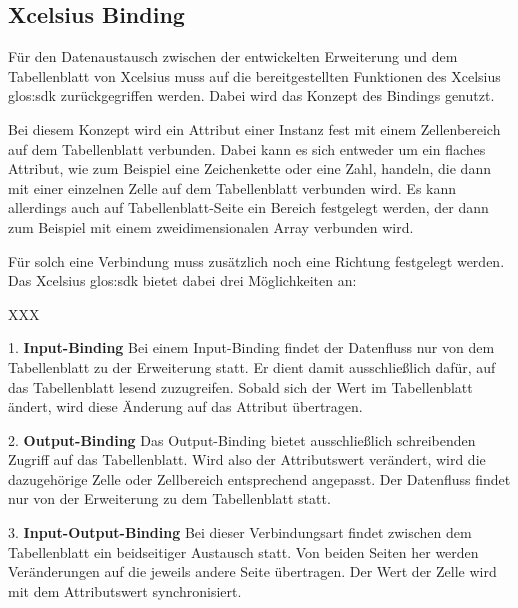 \begin{onehalfspacing}
\subsection{\gls{Xcelsius} Binding}
\label{sec:xcelsius_binding}
Für den Datenaustausch zwischen der entwickelten Erweiterung und dem Tabellenblatt von \gls{Xcelsius} muss auf die bereitgestellten Funktionen des \gls{Xcelsius} \gls{glos:sdk} zurückgegriffen werden. Dabei wird das Konzept des Bindings genutzt.

Bei diesem Konzept wird ein Attribut einer Instanz fest mit einem Zellenbereich auf dem Tabellenblatt verbunden. Dabei kann es sich entweder um ein flaches Attribut, wie zum Beispiel eine Zeichenkette oder eine Zahl, handeln, die dann mit einer einzelnen Zelle auf dem Tabellenblatt verbunden wird. Es kann allerdings auch auf Tabellenblatt-Seite ein Bereich festgelegt werden, der dann zum Beispiel mit einem zweidimensionalen Array verbunden wird.

Für solch eine Verbindung muss zusätzlich noch eine Richtung festgelegt werden. Das \gls{Xcelsius} \gls{glos:sdk} bietet dabei drei Möglichkeiten an:

\begin{seToplist}{ XXX }

\item[1.] \textbf{Input-Binding} \newline
Bei einem Input-Binding findet der Datenfluss nur von dem Tabellenblatt zu der Erweiterung statt. Er dient damit ausschließlich dafür, auf das Tabellenblatt lesend zuzugreifen. Sobald sich der Wert im Tabellenblatt ändert, wird diese Änderung auf das Attribut übertragen.

\item[2.] \textbf{Output-Binding} \newline
Das Output-Binding bietet ausschließlich schreibenden Zugriff auf das Tabellenblatt. Wird also der Attributswert verändert, wird die dazugehörige Zelle oder Zellbereich entsprechend angepasst. Der Datenfluss findet nur von der Erweiterung zu dem Tabellenblatt statt.

\item[3.] \textbf{Input-Output-Binding} \newline
Bei dieser Verbindungsart findet zwischen dem Tabellenblatt ein beidseitiger Austausch statt. Von beiden Seiten her werden Veränderungen auf die jeweils andere Seite übertragen. Der Wert der Zelle wird mit dem Attributswert synchronisiert.

\end{seToplist}


\end{onehalfspacing}
